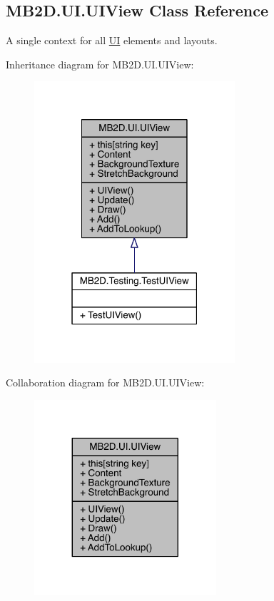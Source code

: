 \hypertarget{class_m_b2_d_1_1_u_i_1_1_u_i_view}{}\subsection{M\+B2\+D.\+U\+I.\+U\+I\+View Class Reference}
\label{class_m_b2_d_1_1_u_i_1_1_u_i_view}


A single context for all \hyperlink{namespace_m_b2_d_1_1_u_i}{UI} elements and layouts.  




Inheritance diagram for M\+B2\+D.\+U\+I.\+U\+I\+View\+:
\nopagebreak
\begin{figure}[H]
\begin{center}
\leavevmode
\includegraphics[width=211pt]{class_m_b2_d_1_1_u_i_1_1_u_i_view__inherit__graph}
\end{center}
\end{figure}


Collaboration diagram for M\+B2\+D.\+U\+I.\+U\+I\+View\+:
\nopagebreak
\begin{figure}[H]
\begin{center}
\leavevmode
\includegraphics[width=191pt]{class_m_b2_d_1_1_u_i_1_1_u_i_view__coll__graph}
\end{center}
\end{figure}
